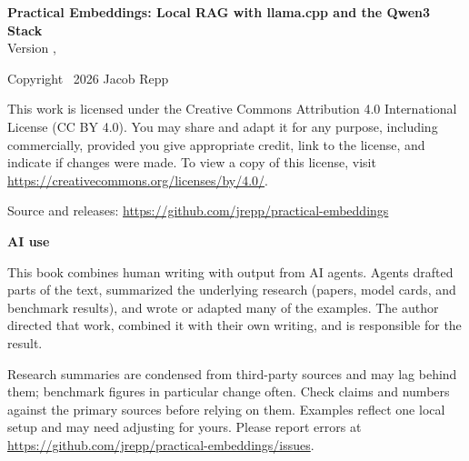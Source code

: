 \thispagestyle{empty}
\vspace*{\fill}

\begin{flushleft}
\small

\textbf{Practical Embeddings: Local RAG with llama.cpp and the Qwen3 Stack}\\
Version \bookversion, \bookdate

\medskip
Copyright \textcopyright\ 2026 Jacob Repp

\medskip
This work is licensed under the Creative Commons Attribution 4.0 International
License (CC BY 4.0). You may share and adapt it for any purpose, including
commercially, provided you give appropriate credit, link to the license, and
indicate if changes were made. To view a copy of this license, visit
\url{https://creativecommons.org/licenses/by/4.0/}.

\medskip
Source and releases: \url{https://github.com/jrepp/practical-embeddings}

\bigskip
\textbf{AI use}

\medskip
This book combines human writing with output from AI agents. Agents drafted
parts of the text, summarized the underlying research (papers, model cards,
and benchmark results), and wrote or adapted many of the examples. The author
directed that work, combined it with their own writing, and is responsible for
the result.

\medskip
Research summaries are condensed from third-party sources and may lag behind
them; benchmark figures in particular change often. Check claims and numbers
against the primary sources before relying on them. Examples reflect one local
setup and may need adjusting for yours. Please report errors at
\url{https://github.com/jrepp/practical-embeddings/issues}.

\end{flushleft}

\clearpage
